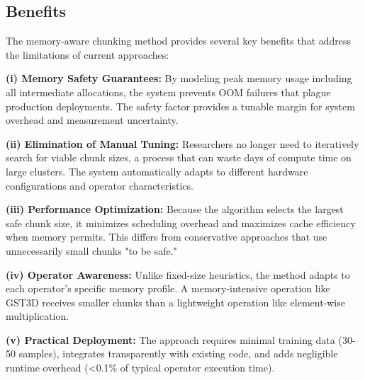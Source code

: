 \subsection{Benefits}

The memory-aware chunking method provides several key benefits that address the limitations of current approaches:

\textbf{(i) Memory Safety Guarantees:} By modeling peak memory usage including all intermediate allocations, the system prevents OOM failures that plague production deployments.
The safety factor provides a tunable margin for system overhead and measurement uncertainty.

\textbf{(ii) Elimination of Manual Tuning:} Researchers no longer need to iteratively search for viable chunk sizes, a process that can waste days of compute time on large clusters.
The system automatically adapts to different hardware configurations and operator characteristics.

\textbf{(iii) Performance Optimization:} Because the algorithm selects the largest safe chunk size, it minimizes scheduling overhead and maximizes cache efficiency when memory permits.
This differs from conservative approaches that use unnecessarily small chunks "to be safe."

\textbf{(iv) Operator Awareness:} Unlike fixed-size heuristics, the method adapts to each operator's specific memory profile.
A memory-intensive operation like \ac{GST3D} receives smaller chunks than a lightweight operation like element-wise multiplication.

\textbf{(v) Practical Deployment:} The approach requires minimal training data (30-50 samples), integrates transparently with existing code, and adds negligible runtime overhead (\textless 0.1\% of typical operator execution time).